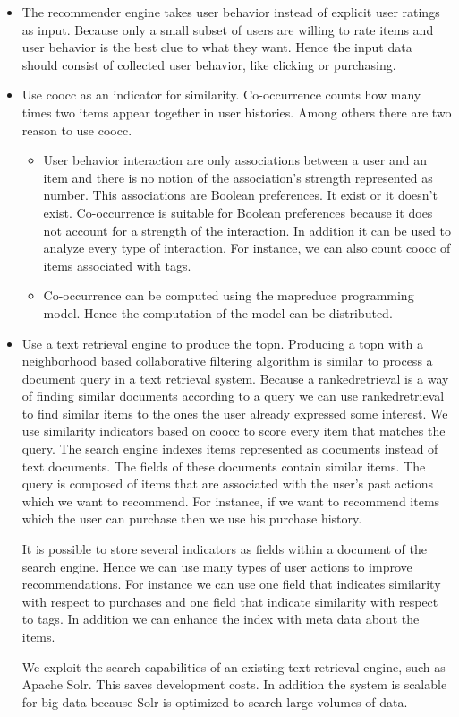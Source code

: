\begin{itemize}
\item The recommender engine takes user behavior instead of explicit user ratings as input. Because only a small subset of users are willing to rate items and user behavior is the best clue to what they want. Hence the input data should consist of collected user behavior, like clicking or purchasing.

\item Use \gls{coocc} as an \gls{indicator} for similarity. Co-occurrence counts how many times two items appear together in user histories. Among others there are two reason to use \gls{coocc}. 

\begin{itemize}
  \item User behavior interaction are only associations between a user and an item and there is no notion of the association's strength represented as number. This associations are Boolean preferences. It exist or it doesn't exist. Co-occurrence is suitable for Boolean preferences because it does not account for a strength of the interaction. In addition it can be used to analyze every type of interaction. For instance, we can also count \gls{coocc} of items associated with tags.
  \item Co-occurrence can be computed using the \gls{mapreduce} programming model. Hence the computation of the model can be distributed.
\end{itemize}

\item Use a text retrieval engine to produce the \gls{topn}. Producing a \gls{topn} with a neighborhood based collaborative filtering algorithm is similar to process a document query in a text retrieval system. Because a \gls{rankedretrieval} is a way of finding similar documents according to a query we can use \gls{rankedretrieval} to find similar items to the ones the user already expressed some interest.
 We use similarity indicators based on \gls{coocc} to score every item that matches the query.
The search engine indexes items represented as documents instead of text documents. The fields of these documents contain similar items. The query is composed of items that are associated with the user's past actions which we want to recommend. For instance, if we want to recommend items which the user can purchase then we use his purchase history. 

It is possible to store several indicators as fields within a document of the search engine. Hence we can use many types of user actions to improve recommendations. For instance we can use one field that indicates similarity with respect to purchases and one field that indicate similarity with respect to \glspl{tag}. In addition we can enhance the index with meta data about the items.

We exploit the search capabilities of an existing text retrieval engine, such as Apache Solr. This saves development costs. In addition the system is \gls{scalable} for big data because Solr is optimized to search large volumes of data.

\end{itemize}

